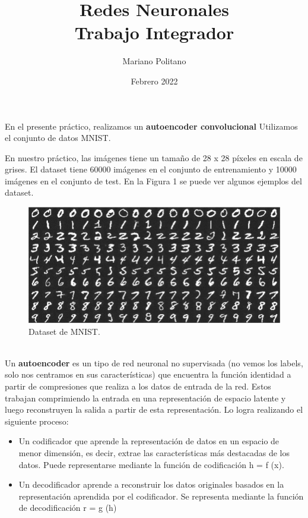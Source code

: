 \documentclass{article}
\title{Redes Neuronales \\
  \large Trabajo Integrador \\
  }
\author{Mariano Politano }
\date{Febrero 2022}
\begin{document}
\maketitle




En el presente práctico, realizamos un \textbf{autoencoder convolucional} Utilizamos el conjunto de datos MNIST.

En nuestro práctico, las imágenes tiene un tamaño de 28 x 28 píxeles en escala de grises. El dataset tiene 60000 imágenes en el conjunto de entrenamiento y 10000 imágenes en el conjunto de test.
En la Figura 1 se puede ver algunos ejemplos del dataset.
\begin{figure}[H]
\centering
\includegraphics[width=\textwidth]{example.png}
\caption{Dataset de MNIST.}
\label{fig1}
\end{figure}

\\

Un \textbf{autoencoder} es un tipo de red neuronal no supervisada (no vemos los labels, solo nos centramos en sus características) que encuentra la función identidad a partir de compresiones que realiza a los datos de entrada de la red. Estos trabajan comprimiendo la entrada en una representación de espacio latente y luego reconstruyen la salida a partir de esta representación. Lo logra realizando el siguiente proceso: 


\begin{itemize}[noitemsep]
\item Un codificador que aprende la representación de datos en un espacio de menor dimensión, es decir, extrae las características más destacadas de los datos. Puede representarse mediante la función de codificación  h = f (x).
\item Un decodificador aprende a reconstruir los datos originales basados en la representación aprendida por el codificador. Se representa mediante la función de decodificación r = g (h)
\end{itemize}
\end{document}
